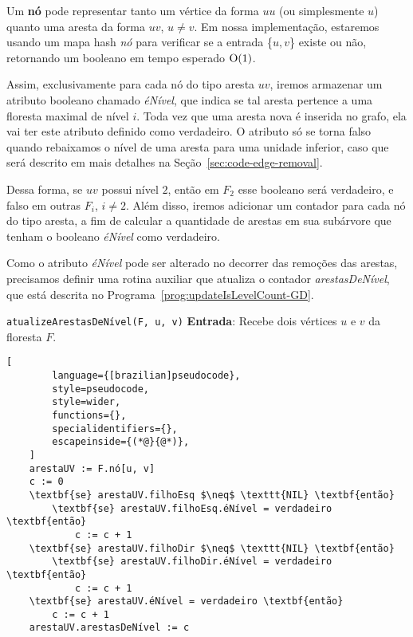 Um \textbf{nó} pode representar tanto um vértice da forma $uu$ (ou simplesmente $u$) quanto uma aresta da forma $uv$, $u \neq v$. Em nossa implementação, estaremos usando um mapa hash \textit{nó} para verificar se a entrada \{$u, v$\} existe ou não, retornando um booleano em tempo esperado $\mathrm{O}(1)$.

Assim, exclusivamente para cada nó do tipo aresta $uv$, iremos armazenar um atributo booleano chamado \textit{éNível}, que indica se tal aresta pertence a uma floresta maximal de nível $i$. Toda vez que uma aresta nova é inserida no grafo, ela vai ter este atributo definido como verdadeiro. O atributo só se torna falso quando rebaixamos o nível de uma aresta para uma unidade inferior, caso que será descrito em mais detalhes na Seção~\ref{sec:code-edge-removal}. 

Dessa forma, se $uv$ possui nível $2$, então em $F_2$ esse booleano será verdadeiro, e falso em outras $F_i$, $i \neq 2$. Além disso, iremos adicionar um contador  para cada nó do tipo aresta, a fim de calcular a quantidade de arestas em sua subárvore que tenham o booleano \textit{éNível} como verdadeiro. 

Como o atributo \textit{éNível} pode ser alterado no decorrer das remoções das arestas, precisamos definir uma rotina auxiliar que atualiza o contador \textit{arestasDeNível}, que está descrita no Programa~\ref{prog:updateIsLevelCount-GD}.

\begin{programruledcaption}{\texttt{atualizeArestasDeNível(F, u, v)} \label{prog:updateIsLevelCount-GD}}
    \noindent\textbf{Entrada}: Recebe dois vértices $u$ e $v$ da floresta $F$.
    \vspace{-0.5\baselineskip}
    \begin{lstlisting}[
        language={[brazilian]pseudocode},
        style=pseudocode,
        style=wider,
        functions={},
        specialidentifiers={},
        escapeinside={(*@}{@*)},
    ]
    arestaUV := F.nó[u, v]
    c := 0
    \textbf{se} arestaUV.filhoEsq $\neq$ \texttt{NIL} \textbf{então}
        \textbf{se} arestaUV.filhoEsq.éNível = verdadeiro \textbf{então}
            c := c + 1
    \textbf{se} arestaUV.filhoDir $\neq$ \texttt{NIL} \textbf{então}
        \textbf{se} arestaUV.filhoDir.éNível = verdadeiro \textbf{então}
            c := c + 1
    \textbf{se} arestaUV.éNível = verdadeiro \textbf{então}
        c := c + 1
    arestaUV.arestasDeNível := c
\end{lstlisting}
\vspace{-0.5\baselineskip}
\end{programruledcaption}

